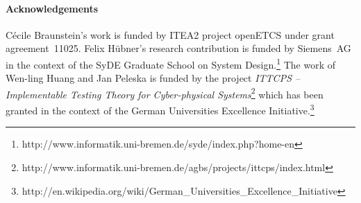 \paragraph{Acknowledgements}
C{\'e}cile Braunstein's work is funded by ITEA2 project openETCS under grant agreement~11025. 
Felix H{\"u}bner's research contribution is funded by 
Siemens~AG in the context of the SyDE Graduate School on System Design.\footnote{http://www.informatik.uni-bremen.de/syde/index.php?home-en}
The work of Wen-ling Huang and Jan Peleska is funded by the project \emph{ITTCPS -- Implementable Testing Theory for Cyber-physical Systems}\footnote{http://www.informatik.uni-bremen.de/agbs/projects/ittcps/index.html} which has been granted in the context of the German Universities Excellence Initiative.\footnote{http://en.wikipedia.org/wiki/German\_Universities\_Excellence\_Initiative}